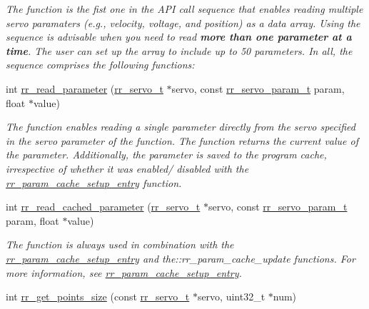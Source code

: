 \begin{DoxyCompactItemize}
\begin{DoxyCompactList}\small\item\em The function is the fist one in the A\+PI call sequence that enables reading multiple servo paramaters (e.\+g., velocity, voltage, and position) as a data array. Using the sequence is advisable when you need to read {\bfseries more than one parameter at a time}. The user can set up the array to include up to 50 parameters. In all, the sequence comprises the following functions\+: \end{DoxyCompactList}\item 
int \hyperlink{group___servo__info_gae665cf9423955f882e94282d66ba6a60}{rr\+\_\+read\+\_\+parameter} (\hyperlink{structrr__servo__t}{rr\+\_\+servo\+\_\+t} $\ast$servo, const \hyperlink{api_8h_aa1f58887fab4642cf49f6f453c1d276d}{rr\+\_\+servo\+\_\+param\+\_\+t} param, float $\ast$value)
\begin{DoxyCompactList}\small\item\em The function enables reading a single parameter directly from the servo specified in the \textquotesingle{}servo\textquotesingle{} parameter of the function. The function returns the current value of the parameter. Additionally, the parameter is saved to the program cache, irrespective of whether it was enabled/ disabled with the \hyperlink{group___servo__info_ga770c1e8b4d868cea649592e26a2706dd}{rr\+\_\+param\+\_\+cache\+\_\+setup\+\_\+entry} function. \end{DoxyCompactList}\item 
int \hyperlink{group___servo__info_ga9249202a29031f84b7dc3da37db05dfc}{rr\+\_\+read\+\_\+cached\+\_\+parameter} (\hyperlink{structrr__servo__t}{rr\+\_\+servo\+\_\+t} $\ast$servo, const \hyperlink{api_8h_aa1f58887fab4642cf49f6f453c1d276d}{rr\+\_\+servo\+\_\+param\+\_\+t} param, float $\ast$value)
\begin{DoxyCompactList}\small\item\em The function is always used in combination with the \hyperlink{group___servo__info_ga770c1e8b4d868cea649592e26a2706dd}{rr\+\_\+param\+\_\+cache\+\_\+setup\+\_\+entry} and the\+::rr\+\_\+param\+\_\+cache\+\_\+update functions. For more information, see \hyperlink{group___servo__info_ga770c1e8b4d868cea649592e26a2706dd}{rr\+\_\+param\+\_\+cache\+\_\+setup\+\_\+entry}. \end{DoxyCompactList}\item 
int \hyperlink{group___servo__info_gae6ed290842e08d349dd86bb1264e6a17}{rr\+\_\+get\+\_\+points\+\_\+size} (const \hyperlink{structrr__servo__t}{rr\+\_\+servo\+\_\+t} $\ast$servo, uint32\+\_\+t $\ast$num)

\end{DoxyCompactItemize}
